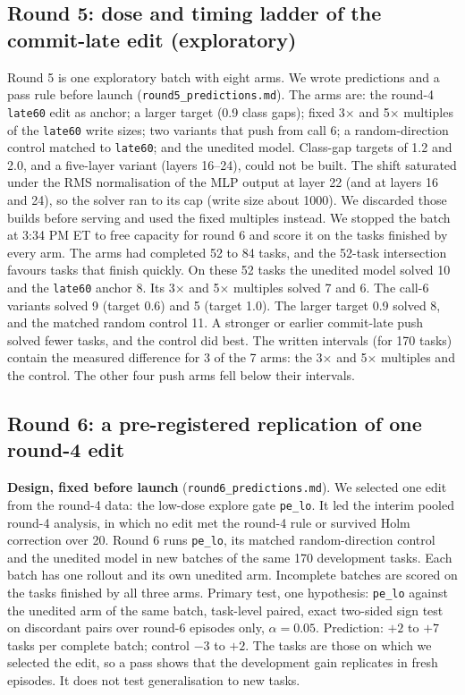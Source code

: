 \subsection{Round 5: dose and timing ladder of the commit-late edit (exploratory)}
\label{app:round5}
Round 5 is one exploratory batch with eight arms. We wrote predictions and a pass rule before launch (\texttt{round5\_predictions.md}). The arms are: the round-4 \texttt{late60} edit as anchor; a larger target (0.9 class gaps); fixed 3$\times$ and 5$\times$ multiples of the \texttt{late60} write sizes; two variants that push from call 6; a random-direction control matched to \texttt{late60}; and the unedited model. Class-gap targets of 1.2 and 2.0, and a five-layer variant (layers 16--24), could not be built. The shift saturated under the RMS normalisation of the MLP output at layer 22 (and at layers 16 and 24), so the solver ran to its cap (write size about 1000). We discarded those builds before serving and used the fixed multiples instead. We stopped the batch at 3:34 PM ET to free capacity for round 6 and score it on the tasks finished by every arm. The arms had completed 52 to 84 tasks, and the 52-task intersection favours tasks that finish quickly. On these 52 tasks the unedited model solved 10 and the \texttt{late60} anchor 8. Its 3$\times$ and 5$\times$ multiples solved 7 and 6. The call-6 variants solved 9 (target 0.6) and 5 (target 1.0). The larger target 0.9 solved 8, and the matched random control 11. A stronger or earlier commit-late push solved fewer tasks, and the control did best. The written intervals (for 170 tasks) contain the measured difference for 3 of the 7 arms: the 3$\times$ and 5$\times$ multiples and the control. The other four push arms fell below their intervals.

\subsection{Round 6: a pre-registered replication of one round-4 edit}
\label{app:round6}
\textbf{Design, fixed before launch} (\texttt{round6\_predictions.md}). We selected one edit from the round-4 data: the low-dose explore gate \texttt{pe\_lo}. It led the interim pooled round-4 analysis, in which no edit met the round-4 rule or survived Holm correction over 20. Round 6 runs \texttt{pe\_lo}, its matched random-direction control and the unedited model in new batches of the same 170 development tasks. Each batch has one rollout and its own unedited arm. Incomplete batches are scored on the tasks finished by all three arms. Primary test, one hypothesis: \texttt{pe\_lo} against the unedited arm of the same batch, task-level paired, exact two-sided sign test on discordant pairs over round-6 episodes only, $\alpha = 0.05$. Prediction: $+2$ to $+7$ tasks per complete batch; control $-3$ to $+2$. The tasks are those on which we selected the edit, so a pass shows that the development gain replicates in fresh episodes. It does not test generalisation to new tasks.

